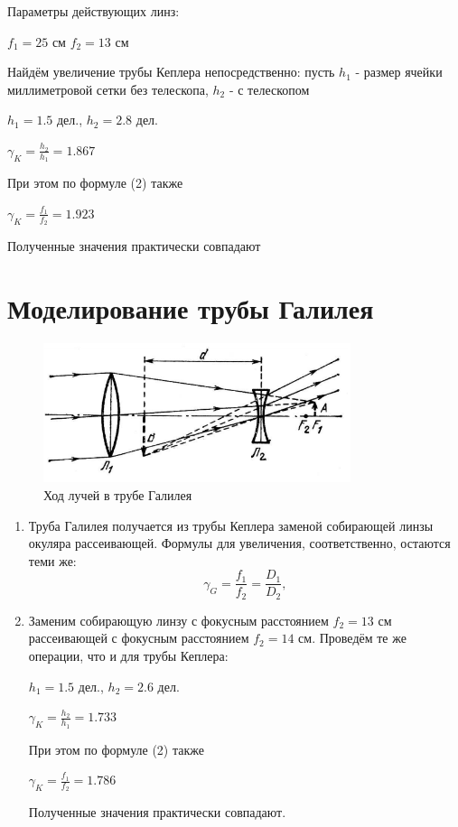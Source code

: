 \documentclass[a4paper]{article}
\begin{document}
\begin{enumerate}
Параметры действующих линз:
\begin{center}
    $f_1 = 25$ см \hspace{1cm} $f_2 = 13$ см
\end{center}

Найдём увеличение трубы Кеплера непосредственно: пусть $h_1$ - размер ячейки миллиметровой сетки без телескопа, $h_2$ - с телескопом
\begin{center}
$h_1 = 1.5$ дел., \hspace{1cm} $h_2 = 2.8$ дел. \par
$\gamma_K = \frac{h_2}{h_1} = 1.867$
\end{center}

При этом по формуле (2) также
\begin{center}
    $\gamma_K = \frac{f_1}{f_2} = 1.923$
\end{center}

Полученные значения практически совпадают
\end{enumerate}

\section{Моделирование трубы Галилея}
    \begin{figure}[h]
    \centering
    \includegraphics[width=9cm]{gal.PNG}
    \caption{Ход лучей в трубе Галилея}
    \label{fig:vac}
\end{figure}

\begin{enumerate}
    \item Труба Галилея получается из трубы Кеплера заменой собирающей линзы окуляра рассеивающей. Формулы для увеличения, соответственно, остаются теми же:
\begin{equation}
    \gamma_G = \frac{f_1}{f_2} = \frac{D_1}{D_2},
\end{equation}

\item Заменим собирающую линзу с фокусным расстоянием $f_2 = 13$ см рассеивающей с фокусным расстоянием $f_2 = 14$ см. Проведём те же операции, что и для трубы Кеплера:

\begin{center}
$h_1 = 1.5$ дел., \hspace{1cm} $h_2 = 2.6$ дел. \par
$\gamma_K = \frac{h_2}{h_1} = 1.733$
\end{center}

При этом по формуле (2) также
\begin{center}
    $\gamma_K = \frac{f_1}{f_2} = 1.786$
\end{center}

Полученные значения практически совпадают.
\end{enumerate}
\end{document}
